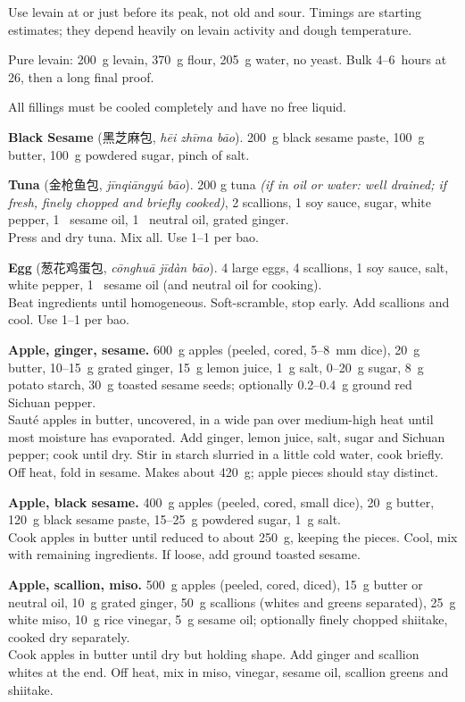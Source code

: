 \notes
Use levain at or just before its peak, not old and sour.  Timings are
starting estimates; they depend heavily on levain activity and dough
temperature.

Pure levain: 200~g levain, 370~g flour, 205~g water, no yeast.  Bulk
4--6~hours at 26\degreeC, then a long final proof.


All fillings must be cooled completely and have no free liquid.

\textbf{Black Sesame} (黑芝麻包, \textit{hēi zhīma bāo}).  200~g
black sesame paste, 100~g butter, 100~g powdered sugar, pinch of
salt.

\textbf{Tuna} (金枪鱼包, \textit{jīnqiāngyú bāo}).  200 g tuna
\textit{(if in oil or water: well drained; if fresh, finely chopped
  and briefly cooked)}, 2 scallions,
1\fracH\tsp{} soy sauce, \fracH\tsp{} sugar, white pepper, 1~\tsp{}
sesame oil, 1~\tsp{} neutral oil, \fracH\tsp{} grated ginger. \\
Press and dry tuna.  Mix all.  Use 1--1\fracH\tbsp{} per bao.

\textbf{Egg} (葱花鸡蛋包, \textit{cōnghuā jīdàn bāo}).  4 large eggs,
4 scallions, 1\fracH\tsp{} soy sauce,
\fracQ\tsp{} salt, white pepper, 1~\tsp{} sesame oil (and neutral oil
for cooking).  \\
Beat ingredients until homogeneous.  Soft-scramble, stop early.  Add
scallions and cool.  Use 1--1\fracH\tbsp{} per bao.

\textbf{Apple, ginger, sesame.}  600~g apples (peeled, cored,
5--8~mm dice), 20~g butter, 10--15~g grated ginger, 15~g lemon juice,
1~g salt, 0--20~g sugar, 8~g potato starch, 30~g toasted sesame seeds;
optionally 0.2--0.4~g ground red Sichuan pepper. \\
Sauté apples in butter, uncovered, in a wide pan over medium-high heat
until most moisture has evaporated.  Add ginger, lemon juice, salt,
sugar and Sichuan pepper; cook until dry.  Stir in starch slurried in a
little cold water, cook briefly.  Off heat, fold in sesame.  Makes
about 420~g; apple pieces should stay distinct.

\textbf{Apple, black sesame.}  400~g apples (peeled, cored, small
dice), 20~g butter, 120~g black sesame paste, 15--25~g powdered sugar,
1~g salt. \\
Cook apples in butter until reduced to about 250~g, keeping the
pieces.  Cool, mix with remaining ingredients.  If loose, add ground
toasted sesame.

\textbf{Apple, scallion, miso.}  500~g apples (peeled, cored, diced),
15~g butter or neutral oil, 10~g grated ginger, 50~g scallions (whites
and greens separated), 25~g white miso, 10~g rice vinegar, 5~g sesame
oil; optionally finely chopped shiitake, cooked dry separately. \\
Cook apples in butter until dry but holding shape.  Add ginger and
scallion whites at the end.  Off heat, mix in miso, vinegar, sesame
oil, scallion greens and shiitake.

